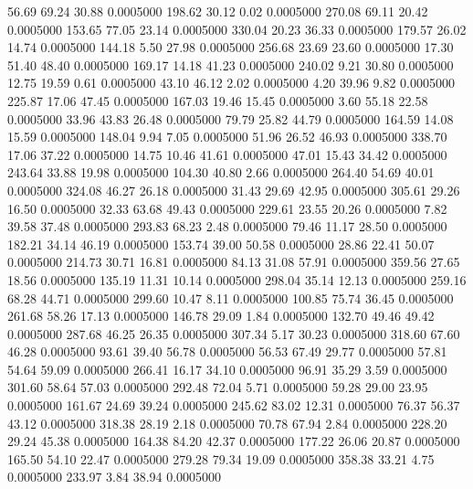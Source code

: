   56.69   69.24   30.88   0.0005000
 198.62   30.12    0.02   0.0005000
 270.08   69.11   20.42   0.0005000
 153.65   77.05   23.14   0.0005000
 330.04   20.23   36.33   0.0005000
 179.57   26.02   14.74   0.0005000
 144.18    5.50   27.98   0.0005000
 256.68   23.69   23.60   0.0005000
  17.30   51.40   48.40   0.0005000
 169.17   14.18   41.23   0.0005000
 240.02    9.21   30.80   0.0005000
  12.75   19.59    0.61   0.0005000
  43.10   46.12    2.02   0.0005000
   4.20   39.96    9.82   0.0005000
 225.87   17.06   47.45   0.0005000
 167.03   19.46   15.45   0.0005000
   3.60   55.18   22.58   0.0005000
  33.96   43.83   26.48   0.0005000
  79.79   25.82   44.79   0.0005000
 164.59   14.08   15.59   0.0005000
 148.04    9.94    7.05   0.0005000
  51.96   26.52   46.93   0.0005000
 338.70   17.06   37.22   0.0005000
  14.75   10.46   41.61   0.0005000
  47.01   15.43   34.42   0.0005000
 243.64   33.88   19.98   0.0005000
 104.30   40.80    2.66   0.0005000
 264.40   54.69   40.01   0.0005000
 324.08   46.27   26.18   0.0005000
  31.43   29.69   42.95   0.0005000
 305.61   29.26   16.50   0.0005000
  32.33   63.68   49.43   0.0005000
 229.61   23.55   20.26   0.0005000
   7.82   39.58   37.48   0.0005000
 293.83   68.23    2.48   0.0005000
  79.46   11.17   28.50   0.0005000
 182.21   34.14   46.19   0.0005000
 153.74   39.00   50.58   0.0005000
  28.86   22.41   50.07   0.0005000
 214.73   30.71   16.81   0.0005000
  84.13   31.08   57.91   0.0005000
 359.56   27.65   18.56   0.0005000
 135.19   11.31   10.14   0.0005000
 298.04   35.14   12.13   0.0005000
 259.16   68.28   44.71   0.0005000
 299.60   10.47    8.11   0.0005000
 100.85   75.74   36.45   0.0005000
 261.68   58.26   17.13   0.0005000
 146.78   29.09    1.84   0.0005000
 132.70   49.46   49.42   0.0005000
 287.68   46.25   26.35   0.0005000
 307.34    5.17   30.23   0.0005000
 318.60   67.60   46.28   0.0005000
  93.61   39.40   56.78   0.0005000
  56.53   67.49   29.77   0.0005000
  57.81   54.64   59.09   0.0005000
 266.41   16.17   34.10   0.0005000
  96.91   35.29    3.59   0.0005000
 301.60   58.64   57.03   0.0005000
 292.48   72.04    5.71   0.0005000
  59.28   29.00   23.95   0.0005000
 161.67   24.69   39.24   0.0005000
 245.62   83.02   12.31   0.0005000
  76.37   56.37   43.12   0.0005000
 318.38   28.19    2.18   0.0005000
  70.78   67.94    2.84   0.0005000
 228.20   29.24   45.38   0.0005000
 164.38   84.20   42.37   0.0005000
 177.22   26.06   20.87   0.0005000
 165.50   54.10   22.47   0.0005000
 279.28   79.34   19.09   0.0005000
 358.38   33.21    4.75   0.0005000
 233.97    3.84   38.94   0.0005000
